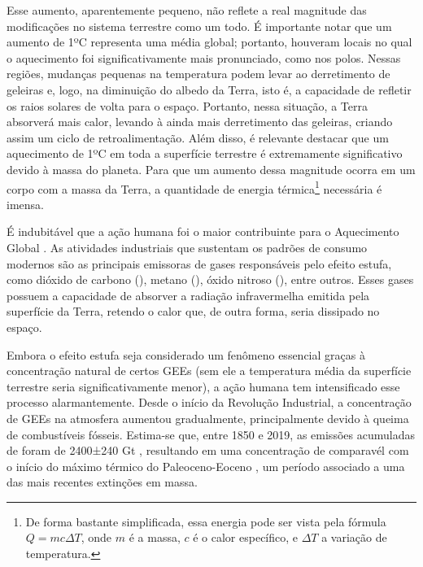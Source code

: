Esse aumento, aparentemente pequeno, não reflete a real magnitude das modificações no sistema terrestre como um todo. É
importante notar que um aumento de 1ºC representa uma média global; portanto, houveram locais no qual o aquecimento foi
significativamente mais pronunciado, como nos polos. Nessas regiões, mudanças pequenas na temperatura podem levar ao
derretimento de geleiras e, logo, na diminuição do albedo da Terra, isto é, a capacidade de refletir os raios solares de
volta para o espaço. Portanto, nessa situação, a Terra absorverá mais calor, levando à ainda mais derretimento das
geleiras, criando assim um ciclo de retroalimentação. Além disso, é relevante destacar que um aquecimento de 1ºC em toda
a superfície terrestre é extremamente significativo devido à massa do planeta. Para que um aumento dessa magnitude
ocorra em um corpo com a massa da Terra, a quantidade de energia térmica\footnote{De forma bastante simplificada, essa
energia pode ser vista pela fórmula $ Q = mc\Delta T $, onde $m$ é a massa, $c$ é o calor específico, e $\Delta T$ a
variação de temperatura.} necessária é imensa.

É indubitável que a ação humana foi o maior contribuinte para o Aquecimento Global \cite{ipcc, gillett}. As atividades
industriais que sustentam os padrões de consumo modernos são as principais emissoras de gases responsáveis pelo efeito
estufa, como dióxido de carbono (), metano (), óxido nitroso (), entre outros. Esses gases
possuem a capacidade de absorver a radiação infravermelha emitida pela superfície da Terra, retendo o calor que, de
outra forma, seria dissipado no espaço. 

Embora o efeito estufa seja considerado um fenômeno essencial graças à concentração natural de certos GEEs (sem ele a
temperatura média da superfície terrestre seria significativamente menor), a ação humana tem intensificado esse processo
alarmantemente. Desde o início da Revolução Industrial, a concentração de GEEs na atmosfera aumentou gradualmente,
principalmente devido à queima de combustíveis fósseis. Estima-se que, entre 1850 e 2019, as emissões acumuladas de
 foram de 2400±240 Gt \cite{friedlingstein}, resultando em uma concentração de  comparavél com o
início do máximo térmico do Paleoceno-Eoceno \cite{gingerich}, um período associado a uma das mais recentes extinções em
massa.

